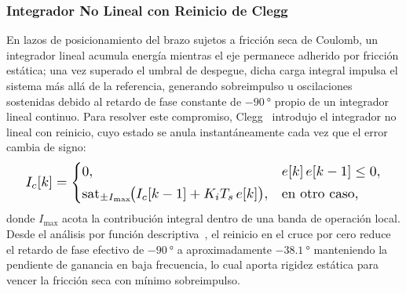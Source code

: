 \subsubsection{Integrador No Lineal con Reinicio de Clegg}
En lazos de posicionamiento del brazo sujetos a fricción seca de Coulomb, un integrador lineal acumula energía mientras el eje permanece adherido por fricción estática; una vez superado el umbral de despegue, dicha carga integral impulsa el sistema más allá de la referencia, generando sobreimpulso u oscilaciones sostenidas debido al retardo de fase constante de $\qty{-90}{\degree}$ propio de un integrador lineal continuo. Para resolver este compromiso, Clegg~\cite{clegg1958} introdujo el integrador no lineal con reinicio, cuyo estado se anula instantáneamente cada vez que el error cambia de signo:
\begin{equation}
\resizebox{0.94\columnwidth}{!}{$\displaystyle
    I_c[k] =
    \begin{cases}
        0, & e[k]\,e[k-1] \le 0, \\[2pt]
        \mathrm{sat}_{\pm I_{\max}}\!\bigl(I_c[k-1] + K_i T_s\,e[k]\bigr), & \text{en otro caso},
    \end{cases}
$}
    \label{eq:clegg_teoria}
\end{equation}
donde $I_{\max}$ acota la contribución integral dentro de una banda de operación local. Desde el análisis por función descriptiva~\cite{clegg1958}, el reinicio en el cruce por cero reduce el retardo de fase efectivo de $\qty{-90}{\degree}$ a aproximadamente $\qty{-38.1}{\degree}$ manteniendo la pendiente de ganancia en baja frecuencia, lo cual aporta rigidez estática para vencer la fricción seca con mínimo sobreimpulso.

